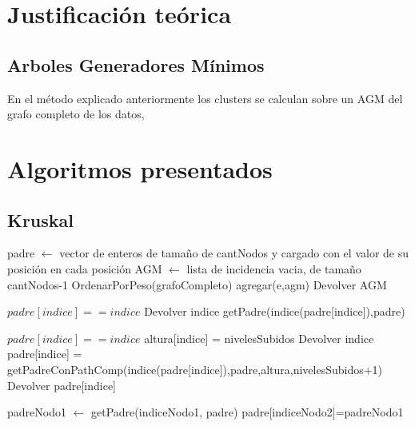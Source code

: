 \documentclass[8pt,a4paper]{article}
\begin{document}
\section{Justificación teórica}

\subsection{Arboles Generadores Mínimos}
En el método explicado anteriormente los clusters se calculan sobre un AGM del grafo completo de los datos, 

\section{Algoritmos presentados}

\subsection{Kruskal}
\begin{codebox}
		\li padre $\gets$ vector de enteros de tamaño de cantNodos y cargado con el valor de su posición en cada posición
		\li AGM $\gets$ lista de incidencia vacia, de tamaño cantNodos-1
		\li OrdenarPorPeso(grafoCompleto)
		\li {} 
			\li {} \Then
				\li agregar(e,agm)
			\li \End
		\li \End
	\li Devolver AGM
\end{codebox}

\begin{codebox}
\li \If $padre[indice] == indice$ \Then
\li Devolver indice
\li \Else
\li getPadre(indice(padre[indice]),padre)
\li \End
\end{codebox}


\begin{codebox}
\li \If $padre[indice] == indice$ \Then
\li altura[indice] = nivelesSubidos
\li Devolver indice
\li \Else
\li padre[indice] = getPadreConPathComp(indice(padre[indice]),padre,altura,nivelesSubidos+1)
\li Devolver padre[indice]
\li \End
\end{codebox}


\begin{codebox}
\li padreNodo1 $\gets$ getPadre(indiceNodo1, padre)
\li padre[indiceNodo2]=padreNodo1
\end{codebox}
\end{document}
